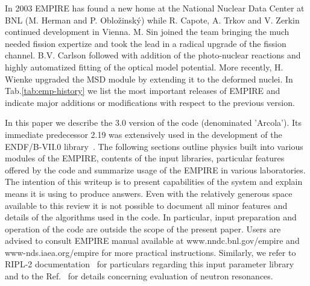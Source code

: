 \documentclass[twocolumn,amsmath,amssymb,10pt,groupedaddress,letter]{revtex4}
\begin{document}
In 2003 EMPIRE has found a new home at the National Nuclear Data Center at BNL (M. Herman and P. Oblo\v zinsk\'y) while R. Capote, A. Trkov and V. Zerkin continued development in Vienna. M. Sin joined the team bringing the much needed fission expertize and took the lead in a radical upgrade of the fission channel. B.V. Carlson followed with addition of the photo-nuclear reactions and highly automatized fitting of the optical model potential. More recently, H. Wienke upgraded the MSD module by extending it to the deformed nuclei. In Tab.\ref{tab:emp-history} we list the most important releases of EMPIRE and indicate major additions or modifications with respect to the previous version.

In this paper we describe the 3.0 version of the code (denominated 'Arcola'). Its immediate predecessor 2.19 was extensively used in the development of the ENDF/B-VII.0 library~\cite{ENDF-VII}. The following sections outline physics built into various modules of the EMPIRE, contents of the input libraries, particular features offered by the code and summarize usage of the EMPIRE in various laboratories. The intention of this writeup is to present capabilities of the system and explain means it is using to produce answers. Even with the relatively generous space available to this review it is not possible to document all minor features and details of the algorithms used in the code. In particular, input preparation and operation of the code are outside the scope of the present paper. Users are advised to consult EMPIRE manual available at www.nndc.bnl.gov/empire and www-nds.iaea.org/empire for more practical instructions. Similarly, we
refer to RIPL-2 documentation~\cite{RIPL2} for particulars regarding this input parameter library and to the Ref.~\cite{Mughabghab:06} for details concerning evaluation of neutron resonances.
\end{document}

